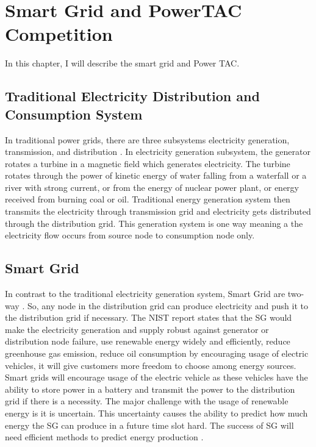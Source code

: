 
\chapter{Smart Grid and PowerTAC Competition}

In this chapter, I will describe the smart grid and Power TAC.

\section{Traditional Electricity Distribution and Consumption System}
In traditional power grids, there are three subsystems electricity generation, transmission, and distribution \cite{fang2012smart}. In electricity generation subsystem, the generator rotates a turbine in a magnetic field which generates electricity. The turbine rotates through the power of kinetic energy of water falling from a waterfall or a river with strong current, or from the energy of nuclear power plant, or energy received from burning coal or oil. Traditional energy generation system then transmits the electricity through transmission grid and electricity gets distributed through the distribution grid. This generation system is one way meaning a the electricity flow occurs from source node to consumption node only.



\section{Smart Grid}
In contrast to the traditional electricity generation system, Smart Grid are two-way \cite{fang2012smart}. So, any node in the distribution grid can produce electricity and push it to the distribution grid if necessary. The NIST report \cite{fang2012smart} states that the SG would make the electricity generation and supply robust against generator or distribution node failure, use renewable energy widely and efficiently, reduce greenhouse gas emission, reduce oil consumption by encouraging usage of electric vehicles, it will give customers more freedom to choose among energy sources. Smart grids will encourage usage of the electric vehicle as these vehicles have the ability to store power in a battery and transmit the power to the distribution grid if there is a necessity. The major challenge with the usage of renewable energy is it is uncertain. This uncertainty causes the ability to predict how much energy the SG can produce in a future time slot hard. The success of SG will need efficient methods to predict energy production \cite{potter2009building}.


